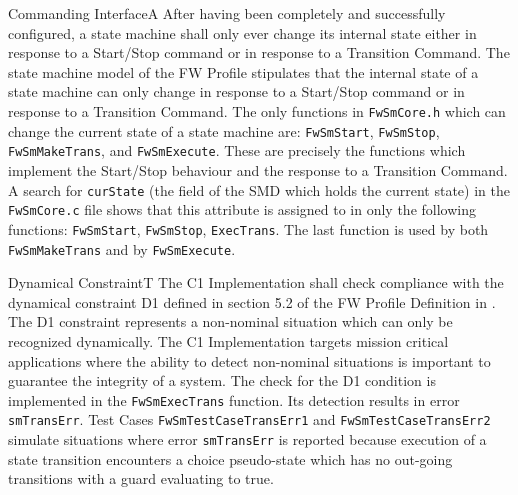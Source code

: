\documentclass[a4paper,10pt]{article}
\newenvironment{fw_req}[6]
{\addtocounter{subsubsection}{1}
	\hspace{0.2cm}\textbf{FW-\arabic{section}.\arabic{subsection}.\arabic{subsubsection}/#2
	\hspace{0.8cm} #1}
	\vspace{-10pt}
\begin{longtable}{p{2.7cm}P{8.5cm}}
\hline
\textsc{Requirement} & #3 \\
\textsc{Justification} & #4 \\
\textsc{Implementation} & #5  \\ 
\textsc{Verification} & #6  \\
\hline
}
{\end{longtable}}
\begin{document}
\begin{fw_req}{Commanding Interface}{A}
{After having been completely and successfully configured, 
a state machine shall only ever change its internal state either in response to a 
Start/Stop command or in response to a Transition Command.}
{The state machine model of the FW Profile stipulates that the internal state of a state machine 
can only change in response to a Start/Stop command or in response to a Transition Command.}
{The only functions in \texttt{FwSmCore.h} which can 
change the current state of a state machine are: \texttt{FwSmStart}, \texttt{FwSmStop},
\texttt{FwSmMakeTrans}, and \texttt{FwSmExecute}. These are precisely 
the functions which implement the Start/Stop behaviour and the response to a 
Transition Command.} 
{A search for \texttt{curState} (the field of the SMD which holds 
the current state) in the \texttt{FwSmCore.c} 
file shows that this attribute is assigned to in only the following 
functions: \texttt{FwSmStart}, \texttt{FwSmStop}, \texttt{ExecTrans}. 
The last function is used by both \texttt{FwSmMakeTrans} and by \texttt{FwSmExecute}.}
\end{fw_req}

\begin{fw_req}{Dynamical Constraint}{T}
{The C1 Implementation shall check compliance with the dynamical 
constraint D1 defined in section 5.2 of the FW Profile 
Definition in \cite{ref:fwprofile}.}
{The D1 constraint represents a non-nominal situation which can
only be recognized dynamically. 
The C1 Implementation targets mission critical applications where the ability to 
detect non-nominal situations is important to guarantee the integrity of a system.}
{The check for the D1 condition is implemented in 
the \texttt{FwSmExecTrans} function. 
Its detection results in error \texttt{smTransErr}.} 
{Test Cases \texttt{FwSmTestCaseTransErr1} and
\texttt{FwSmTestCaseTransErr2} simulate situations where error \texttt{smTransErr} 
is reported because execution of a state transition encounters a choice pseudo-state
which has no out-going transitions with a guard evaluating to true.}
\end{fw_req}
\end{document}
